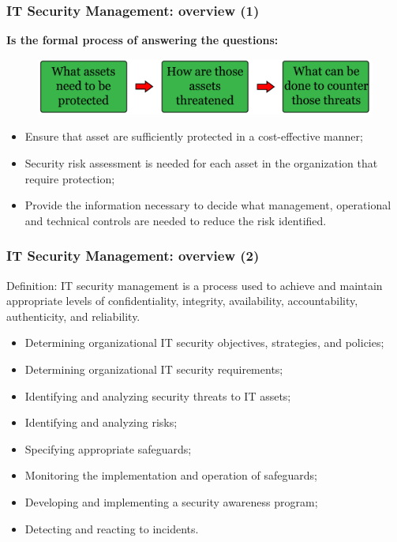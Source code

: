 \documentclass[xcolor ={table,usenames,dvipsnames}]{beamer}
\theoremstyle{definition}
\begin{document}
	
	\begin{frame}
		\frametitle{IT Security Management: overview (1)}
	\textbf{	Is the formal process of answering the questions:}
		\begin{figure}[h!]
			\centering
			\includegraphics[scale=0.20]{img/img_01.PNG}
			\label{Interfacce di un CS}
		\end{figure}
		\begin{itemize}
			\item Ensure that asset are sufficiently protected in a cost-effective manner;
			\item Security risk assessment is needed for each asset in the organization that require protection;
			\item Provide the information necessary to decide what management, operational and technical controls are needed to reduce the risk identified.
		\end{itemize}
	\end{frame}

	\begin{frame}
		\frametitle{IT Security Management: overview (2)}
		\begin{alertblock}{Definition:}
			 IT security management is a process used to achieve and maintain appropriate levels of confidentiality, integrity, availability, accountability, authenticity, and reliability. 
		\end{alertblock}
		\begin{itemize}
			\item Determining organizational IT security objectives, strategies, and policies;
			\item Determining organizational IT security requirements;
			\item Identifying and analyzing security threats to IT assets; 
			\item Identifying and analyzing risks;
			\item Specifying appropriate safeguards;
			\item Monitoring the implementation and operation of safeguards;
			\item Developing and implementing a security awareness program;
			\item Detecting and reacting to incidents.
		\end{itemize}	
	\end{frame}
\end{document}
